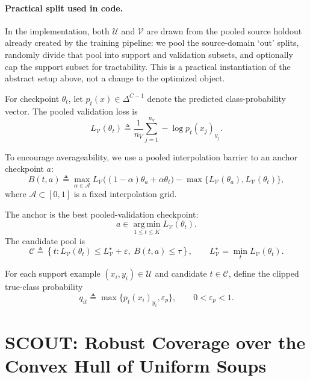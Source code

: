 \documentclass{article}
\newcommand{\cA}{\mathcal{A}}
\newcommand{\cC}{\mathcal{C}}
\newcommand{\cU}{\mathcal{U}}
\newcommand{\cV}{\mathcal{V}}
\newcommand{\argmin}{\operatorname*{arg\,min}}
\newcommand{\simplex}{\Delta}
\newcommand{\scout}{\textup{\textsc{SCOUT}}}
\newcommand{\eps}{\varepsilon}
\begin{document}
\paragraph{Practical split used in code.}
In the implementation, both \(\cU\) and \(\cV\) are drawn from the pooled source holdout already created by the training pipeline: we pool the source-domain `out' splits, randomly divide that pool into support and validation subsets, and optionally cap the support subset for tractability. This is a practical instantiation of the abstract setup above, not a change to the optimized object.

For checkpoint \(\theta_t\), let \(p_t(x)\in\simplex^{C-1}\) denote the predicted class-probability vector. The pooled validation loss is
\begin{equation}
    L_{\cV}(\theta_t)
    \triangleq
    \frac{1}{n_V}\sum_{j=1}^{n_V} -\log p_t(x_j)_{y_j}.
    \label{eq:val_loss}
\end{equation}

To encourage averageability, we use a pooled interpolation barrier to an anchor checkpoint \(a\):
\begin{equation}
    B(t,a)
    \triangleq
    \max_{\alpha\in\cA}
    L_{\cV}\!\big((1-\alpha)\theta_a + \alpha \theta_t\big)
    -
    \max\{L_{\cV}(\theta_a),L_{\cV}(\theta_t)\},
    \label{eq:barrier}
\end{equation}
where \(\cA\subset [0,1]\) is a fixed interpolation grid.

The anchor is the best pooled-validation checkpoint:
\begin{equation}
    a \in \argmin_{1\le t\le K} L_{\cV}(\theta_t).
    \label{eq:anchor}
\end{equation}
The candidate pool is
\begin{equation}
    \cC
    \triangleq
    \left\{
        t :
        L_{\cV}(\theta_t)\le L_{\cV}^{\star} + \eps,
        \;
        B(t,a)\le \tau
    \right\},
    \qquad
    L_{\cV}^{\star} = \min_t L_{\cV}(\theta_t).
    \label{eq:candidate_pool}
\end{equation}

For each support example \((x_i,y_i)\in\cU\) and candidate \(t\in\cC\), define the clipped true-class probability
\begin{equation}
    q_{it}
    \triangleq
    \max\!\{p_t(x_i)_{y_i}, \eps_p\},
    \qquad
    0<\eps_p<1.
    \label{eq:qit}
\end{equation}

\section{\scout{}: Robust Coverage over the Convex Hull of Uniform Soups}
\label{sec:method}
\end{document}
